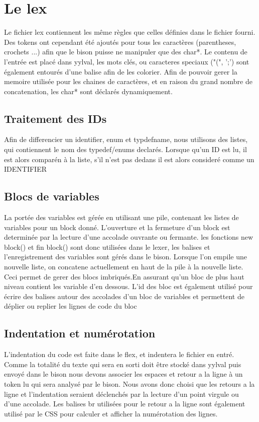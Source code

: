 \documentclass{report}
\begin{document}
\section{Le lex}{
		Le fichier lex contiennent les même règles que celles définies dans le fichier fourni. Des tokens ont cependant été ajoutés pour tous les caractères (parentheses, crochets ...) afin 
		que le bison puisse ne manipuler que des char*. Le contenu de l'entrée est placé dans yylval, les mots clés, ou caracteres speciaux ("(", ';') sont également entourés d'une balise
		afin de les colorier. Afin de pouvoir gerer la memoire utilisée pour les chaines de caractères, et en raison du grand nombre de concatenation, les char* sont déclarés dynamiquement.
		\subsection{Traitement des IDs}{
	Afin de differencier un identifier, enum et typdefname, nous utilisons des listes, qui contiennent le nom des typedef/enums declarés. Lorsque qu'un ID est lu, il est alors comparén à
			 la liste, s'il n'est pas dedans il est alors consideré comme un IDENTIFIER
}
		\subsection{Blocs de variables}{
		La portée des variables est gérée en utilisant une pile, contenant les listes de variables pour un block donné. L'ouverture et la fermeture d'un block est determinée par la lecture d'une accolade ouvrante ou fermante. les fonctions new block() et fin block() sont donc utilisées dans le lexer, les balises et l'enregistrement des variables sont gérés dans le bison. Lorsque l'on empile une nouvelle liste, on concatene actuellement en haut de la pile à la nouvelle liste. Ceci permet de gerer des blocs imbriqués.En assurant qu'un bloc de plus haut niveau contient les variable d'en dessous.
L'id des bloc est également utilisé pour écrire des balises autour des accolades d'un bloc de variables et permettent de déplier ou replier les lignes de code du bloc
}
		\subsection{Indentation et numérotation}{
			L'indentation du code est faite dans le flex, et indentera le fichier en entré. Comme la totalité du texte qui sera en sorti doit être stocké dans yylval puis envoyé dans le bison nous devons associer les espaces et retour a la ligne à un token lu qui sera analysé par le bison. Nous avons donc choisi que les retours a la ligne et l'indentation seraient déclenchés par la lecture d'un point virgule ou d'une accolade. Les balises br utilisées pour le retour a la ligne sont également utilisé par le CSS pour calculer et afficher la numérotation des lignes.
}
}
\end{document}
